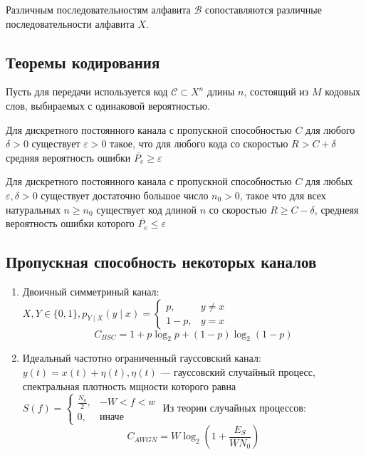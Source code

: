 Различным последовательностям алфавита \(\mathcal B\) сопоставляются различные последовательности алфавита \(X\).
\?

\subsection{Теоремы кодирования}

Пусть для передачи используется код \(\mathcal C \subset X^n\) длины \(n\), состоящий из \(M\) кодовых слов, выбираемых с одинаковой вероятностью.

\begin{theorem}[обратная]
    Для дискретного постоянного канала с пропускной способностью \(C\) для любого \(\delta > 0\) существует \(\varepsilon > 0\) такое, что для любого кода со скоростью \(R > C + \delta\) средняя вероятность ошибки \(\overline{P_e} \ge \varepsilon\)
\end{theorem}

\begin{theorem}[прямая]
    Для дискретного постоянного канала с пропускной способностью \(C\) для любых \(\varepsilon, \delta > 0\) существует достаточно большое число \(n_0 > 0\), такое что для всех натуральных \(n \ge n_0\) существует код длиной \(n\) со скоростью \(R \ge C - \delta\), среднеяя вероятность ошибки которого \(\overline{P_e} \le \varepsilon\)
\end{theorem}

\subsection{Пропускная способность некоторых каналов}

\begin{enumerate}
    \item Двоичный симметриный канал: \(X, Y \in \{0, 1\}, p_{Y \mid X}(y \mid x) = \begin{cases}
            p, & y \neq x \\
            1 - p , & y = x
    \end{cases}\)
    \[C_{BSC} = 1 + p \log_2 p + (1 - p) \log_2(1 - p)\] 
\item Идеальный частотно ограниченный гауссовский канал: \(y(t) = x(t) + \eta(t), \eta(t)\) --- гауссовский случайный процесс, спектральная плотность  мщности которого равна \(S(f) = \begin{cases}
            \frac{N_0}{2}, & -W < f < w \\
            0, & \text{иначе}
    \end{cases}\)
    Из теории случайных процессов:
    \[C_{AWGN} = W \log_2 \left(1 + \frac{E_S}{WN_0}\right)\] 
    \?
\end{enumerate}
